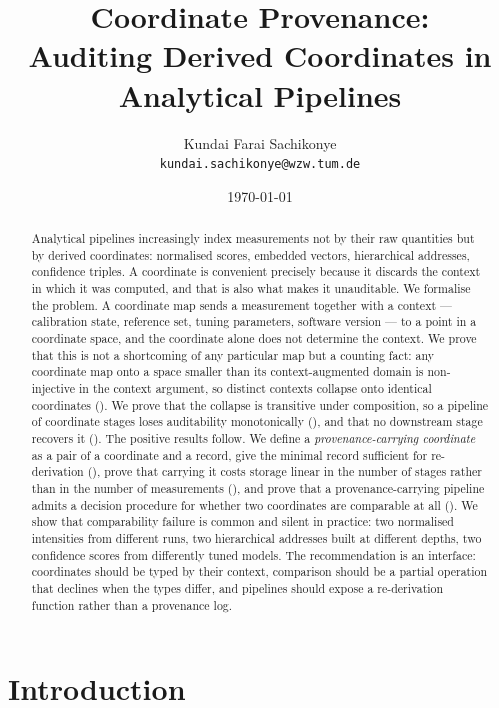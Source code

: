 \documentclass[11pt,a4paper]{article}
\title{\textbf{Coordinate Provenance:\\[2pt]
Auditing Derived Coordinates in Analytical Pipelines}}
\author{Kundai Farai Sachikonye\\
\texttt{kundai.sachikonye@wzw.tum.de}}
\date{\today}
\theoremstyle{definition}
\theoremstyle{remark}
\begin{document}
\maketitle

\begin{abstract}
\noindent
Analytical pipelines increasingly index measurements not by their raw
quantities but by derived coordinates: normalised scores, embedded
vectors, hierarchical addresses, confidence triples. A coordinate is
convenient precisely because it discards the context in which it was
computed, and that is also what makes it unauditable. We formalise the
problem. A coordinate map sends a measurement together with a context ---
calibration state, reference set, tuning parameters, software version ---
to a point in a coordinate space, and the coordinate alone does not
determine the context. We prove that this is not a shortcoming of any
particular map but a counting fact: any coordinate map onto a space
smaller than its context-augmented domain is non-injective in the
context argument, so distinct contexts collapse onto identical
coordinates (). We prove that the collapse is
transitive under composition, so a pipeline of coordinate stages loses
auditability monotonically (), and that no
downstream stage recovers it (). The positive
results follow. We define a \emph{provenance-carrying coordinate} as a
pair of a coordinate and a record, give the minimal record sufficient for
re-derivation (), prove that carrying it costs
storage linear in the number of stages rather than in the number of
measurements (), and prove that a
provenance-carrying pipeline admits a decision procedure for whether two
coordinates are comparable at all (). We show
that comparability failure is common and silent in practice: two
normalised intensities from different runs, two hierarchical addresses
built at different depths, two confidence scores from differently tuned
models. The recommendation is an interface: coordinates should be typed
by their context, comparison should be a partial operation that declines
when the types differ, and pipelines should expose a re-derivation
function rather than a provenance log.
\end{abstract}

\section{Introduction}
\label{sec:intro}
\end{document}

